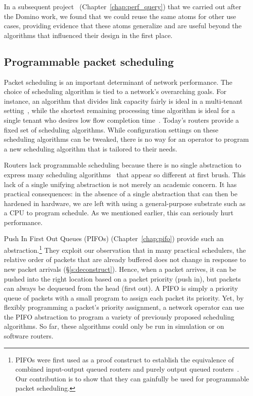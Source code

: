 In a subsequent project~\cite{perf_query} (Chapter~\ref{chap:perf_query}) that we carried out after
the Domino work, we found that we could reuse the same atoms for other use
cases, providing evidence that these atoms generalize and are useful beyond the
algorithms that influenced their design in the first place.

\subsection{Programmable packet scheduling}
Packet scheduling is an important determinant of network performance. The
choice of scheduling algorithm is tied to a network's overarching goals. For
instance, an algorithm that divides link capacity fairly is ideal in a
multi-tenant setting~\cite{wfq}, while the shortest remaining processing time
algorithm is ideal for a single tenant who desires low flow completion
time~\cite{pFabric}. Today's routers provide a fixed set of scheduling
algorithms. While configuration settings on these scheduling algorithms can be
tweaked, there is no way for an operator to program a new scheduling algorithm
that is tailored to their needs.

Routers lack programmable scheduling because there is no single abstraction to
express many scheduling algorithms~\cite{wfq, srpt, srr, pFabric, lstf, csz}
that appear so different at first brush. This lack of a single unifying
abstraction is not merely an academic concern. It has practical consequences:
in the absence of a single abstraction that can then be hardened in hardware,
we are left with using a general-purpose substrate such as a CPU to program
schedule. As we mentioned earlier, this can seriously hurt performance.

 Push In First Out Queues (PIFOs) (Chapter~\ref{chap:pifo}) provide such an
abstraction.\footnote{PIFOs were first used as a proof construct to establish
the equivalence of combined input-output queued routers and purely output
queued routers~\cite{pifo}. Our contribution is to show that they can gainfully
be used for programmable packet scheduling.} They exploit our observation that
in many practical schedulers, the relative order of packets that are already
buffered does not change in response to new packet arrivals
(\S\ref{s:deconstruct}). Hence, when a packet arrives, it can be pushed into
the right location based on a packet priority (push in), but packets can always
be dequeued from the head (first out). A PIFO is simply a
priority queue of packets with a small program to assign each packet its
priority. Yet, by flexibly programming a packet's priority assignment, a
network operator can use the PIFO abstraction to program a variety of
previously proposed scheduling algorithms. So far, these algorithms could only
be run in simulation or on software routers.

